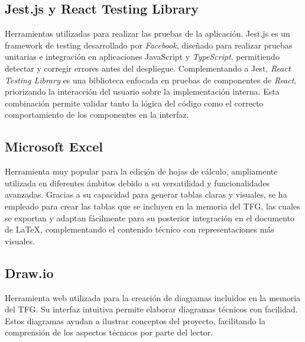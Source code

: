 \subsection{Jest.js y React Testing Library}
Herramientas utilizadas para realizar las pruebas de la aplicación. Jest.js es un framework de testing desarrollado por \textit{Facebook}, diseñado para realizar pruebas unitarias e integración en aplicaciones JavaScript y \textit{TypeScript}, permitiendo detectar y corregir errores antes del despliegue. Complementando a Jest, \textit{React Testing Library} es una biblioteca enfocada en pruebas de componentes de \textit{React}, priorizando la interacción del usuario sobre la implementación interna. Esta combinación permite validar tanto la lógica del código como el correcto comportamiento de los componentes en la interfaz.

\subsection{Microsoft Excel}
Herramienta muy popular para la edición de hojas de cálculo, ampliamente utilizada en diferentes ámbitos debido a su versatilidad y funcionalidades avanzadas. Gracias a su capacidad para generar tablas claras y visuales, se ha empleado para crear las tablas que se incluyen en la memoria del TFG, las cuales se exportan y adaptan fácilmente para su posterior integración en el documento de \LaTeX, complementando el contenido técnico con representaciones más visuales.

\subsection{Draw.io}
Herramienta web utilizada para la creación de diagramas incluidos en la memoria del TFG. Su interfaz intuitiva permite elaborar diagramas técnicos con facilidad. Estos diagramas ayudan a ilustrar conceptos del proyecto, facilitando la comprensión de los aspectos técnicos por parte del lector.

